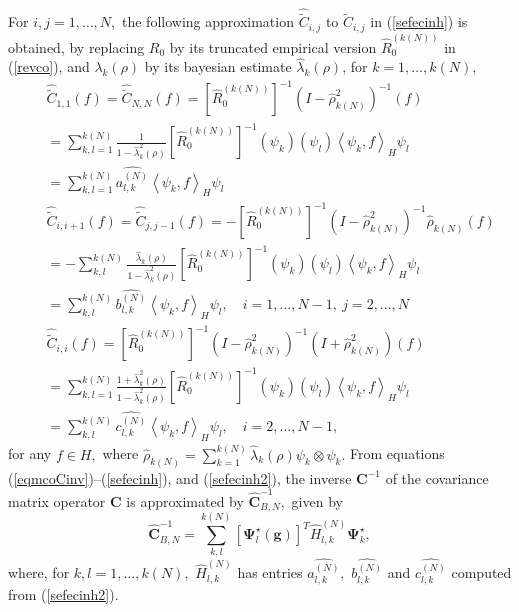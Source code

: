 \documentclass[11pt,a4paper]{article}
\begin{document}
For $i,j=1,\dots,N,$ the following approximation  $\widehat{\widetilde{C}}_{i,j}$ to $\widetilde{C}_{i,j}$
   in (\ref{sefecinh})  is  obtained, by replacing $R_{0}$  by its truncated  empirical version    $\widehat{R}_{0}^{(k(N))}$ in (\ref{revco}), and
   $\lambda_{k}(\rho)$ by its bayesian estimate $\widehat{\lambda}_{k}(\rho)$,  for $k=1,\dots,k(N),$
\begin{eqnarray}&&
\widehat{\widetilde{C}}_{1,1}(f)=\widehat{\widetilde{C}}_{N,N}(f)
= [\widehat{R}_{0}^{(k(N))}]^{-1}(I-\widehat{\rho}_{k(N)}^{2})^{-1}(f)
\nonumber\\
&& =\sum_{k,l=1}^{k(N)}
 \frac{1}{1-\widehat{\lambda}_{k}^{2}(\rho)}\left[\widehat{R}_{0}^{(k(N))}\right]^{-1}(\psi_{k})(\psi_{l})\left\langle \psi_{k},f\right\rangle_{H}\psi_{l}\nonumber\\
 && =\sum_{k,l=1}^{k(N)}\widehat{a_{l,k}^{(N)}}\left\langle \psi_{k},f\right\rangle_{H}\psi_{l} \nonumber\\
&&\widehat{\widetilde{C}}_{i,i+1}(f)=\widehat{\widetilde{C}}_{j,j-1}(f)=
   -[\widehat{R}_{0}^{(k(N))}]^{-1}(I-\widehat{\rho}_{k(N)}^{2})^{-1}
\widehat{\rho}_{k(N)} (f)
\nonumber\\
&&= -\sum_{k,l}^{k(N)}\frac{\widehat{\lambda}_{k}(\rho)}{1-\widehat{\lambda}_{k}^{2}(\rho)}
 [\widehat{R}_{0}^{(k(N))}]^{-1}(\psi_{k})(\psi_{l})\left\langle \psi_{k},f\right\rangle_{H}\psi_{l}\nonumber\\
 && =\sum_{k,l}^{k(N)}\widehat{b_{l,k}^{(N)}}\left\langle \psi_{k},f\right\rangle_{H}\psi_{l},\quad i=1,\dots, N-1,
\ j=2,\dots, N\nonumber\\&&
\widehat{\widetilde{C}}_{i,i}(f)=
  [\widehat{R}_{0}^{(k(N))}]^{-1}(I-\widehat{\rho}_{k(N)}^{2})^{-1}(I+\widehat{\rho}_{k(N)}^{2})(f)
\nonumber\\
&&=\sum_{k,l=1}^{k(N)}
 \frac{1+\widehat{\lambda}_{k}^{2}(\rho)}{1-\widehat{\lambda}_{k}^{2}(\rho)}
[ \widehat{R}_{0}^{(k(N))}]^{-1}(\psi_{k})(\psi_{l})
  \left\langle \psi_{k},f\right\rangle_{H}\psi_{l}\nonumber\\
 && =\sum_{k,l}^{k(N)}\widehat{c_{l,k}^{(N)}}\left\langle \psi_{k},f\right\rangle_{H}\psi_{l} ,\quad i=2,\dots, N-1,
   \label{sefecinh2}
 \end{eqnarray}
\noindent for any $f\in H,$  where $\widehat{\rho}_{k(N)}=\sum_{k=1}^{k(N)}\widehat{\lambda}_{k}(\rho)\psi_{k}\otimes \psi_{k}.$
From equations (\ref{eqmcoCinv})--(\ref{sefecinh}), and (\ref{sefecinh2}), the inverse $\mathbf{C}^{-1}$ of the covariance matrix operator $\mathbf{C}$
is approximated by $\widehat{\mathbf{C}}^{-1}_{B, N},$  given by  \begin{equation}\widehat{\mathbf{C}}^{-1}_{B, N}=\sum_{k,l}^{k(N)}[\boldsymbol{\Psi}_{l}^{\star}(\mathbf{g})]^{T}
\widehat{H}_{l,k}^{(N)}\boldsymbol{\Psi}_{k}^{\star},\label{cbs}\end{equation} \noindent where, for $k,l=1,\dots,k(N),$  $\widehat{H}_{l,k}^{(N)}$ has   entries
$\widehat{a_{l,k}^{(N)}},$ $\widehat{b_{l,k}^{(N)}}$   and $\widehat{c_{l,k}^{(N)}}$ computed from  (\ref{sefecinh2}).
\end{document}

